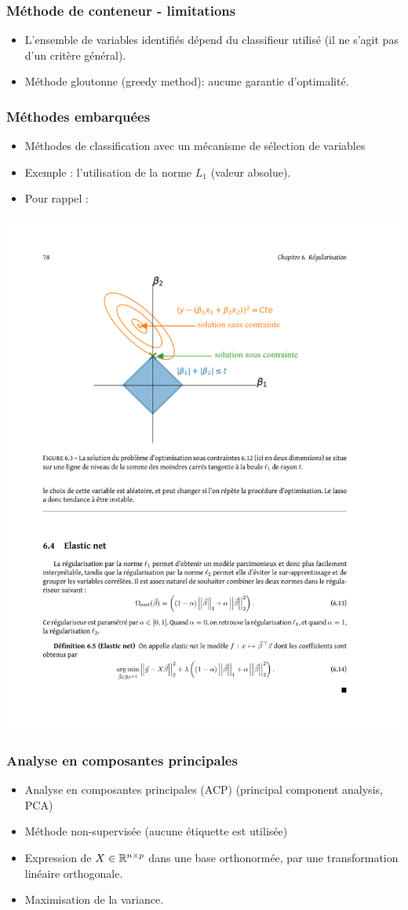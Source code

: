 \begin{frame}
  \frametitle{Méthode de conteneur - limitations}
  \begin{itemize}
  	\item L'ensemble de variables identifiés dépend du classifieur utilisé (il ne s'agit pas d'un critère général). 
  	\item Méthode gloutonne (greedy method): aucune garantie d'optimalité. 
  \end{itemize}
\end{frame}

\begin{frame}
  \frametitle{Méthodes embarquées}
  \begin{itemize}
  	\item Méthodes de classification avec un mécanisme de sélection de variables
  	\item Exemple : l'utilisation de la norme $L_1$ (valeur absolue).  
  	\item Pour rappel : 
  \end{itemize}
  \begin{center}
    \includegraphics[width=.6\textwidth]{figures/l1reg_geom}  
  \end{center}
\end{frame}

\begin{frame}
  \frametitle{Analyse en composantes principales}
  \begin{itemize}
  	\item Analyse en composantes principales (ACP) (principal component analysis, PCA)
  	\item Méthode non-supervisée (aucune étiquette est utilisée)
  	\item Expression de $X\in {\mathbb R}^{n\times p}$ dans une base orthonormée, par une transformation linéaire orthogonale.
  	\item Maximisation de la variance.
  \end{itemize}
\end{frame}

